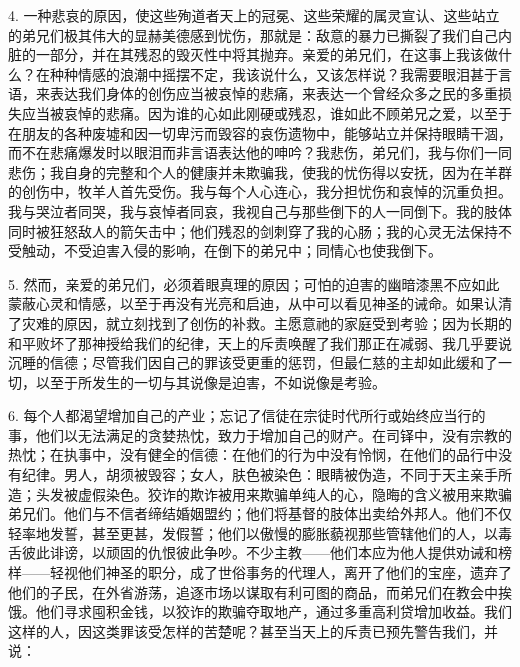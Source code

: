 4. 一种悲哀的原因，使这些殉道者天上的冠冕、这些荣耀的属灵宣认、这些站立的弟兄们极其伟大的显赫美德感到忧伤，那就是：敌意的暴力已撕裂了我们自己内脏的一部分，并在其残忍的毁灭性中将其抛弃。亲爱的弟兄们，在这事上我该做什么？在种种情感的浪潮中摇摆不定，我该说什么，又该怎样说？我需要眼泪甚于言语，来表达我们身体的创伤应当被哀悼的悲痛，来表达一个曾经众多之民的多重损失应当被哀悼的悲痛。因为谁的心如此刚硬或残忍，谁如此不顾弟兄之爱，以至于在朋友的各种废墟和因一切卑污而毁容的哀伤遗物中，能够站立并保持眼睛干涸，而不在悲痛爆发时以眼泪而非言语表达他的呻吟？我悲伤，弟兄们，我与你们一同悲伤；我自身的完整和个人的健康并未欺骗我，使我的忧伤得以安抚，因为在羊群的创伤中，牧羊人首先受伤。我与每个人心连心，我分担忧伤和哀悼的沉重负担。我与哭泣者同哭，我与哀悼者同哀，我视自己与那些倒下的人一同倒下。我的肢体同时被狂怒敌人的箭矢击中；他们残忍的剑刺穿了我的心肠；我的心灵无法保持不受触动，不受迫害入侵的影响，在倒下的弟兄中；同情心也使我倒下。\par

5. 然而，亲爱的弟兄们，必须着眼真理的原因；可怕的迫害的幽暗漆黑不应如此蒙蔽心灵和情感，以至于再没有光亮和启迪，从中可以看见神圣的诫命。如果认清了灾难的原因，就立刻找到了创伤的补救。主愿意祂的家庭受到考验；因为长期的和平败坏了那神授给我们的纪律，天上的斥责唤醒了我们那正在减弱、我几乎要说沉睡的信德；尽管我们因自己的罪该受更重的惩罚，但最仁慈的主却如此缓和了一切，以至于所发生的一切与其说像是迫害，不如说像是考验。\par

6. 每个人都渴望增加自己的产业；忘记了信徒在宗徒时代所行或始终应当行的事，他们以无法满足的贪婪热忱，致力于增加自己的财产。在司铎中，没有宗教的热忱；在执事中，没有健全的信德：在他们的行为中没有怜悯，在他们的品行中没有纪律。男人，胡须被毁容；女人，肤色被染色：眼睛被伪造，不同于天主亲手所造；头发被虚假染色。狡诈的欺诈被用来欺骗单纯人的心，隐晦的含义被用来欺骗弟兄们。他们与不信者缔结婚姻盟约；他们将基督的肢体出卖给外邦人。他们不仅轻率地发誓，甚至更甚，发假誓；他们以傲慢的膨胀藐视那些管辖他们的人，以毒舌彼此诽谤，以顽固的仇恨彼此争吵。不少主教——他们本应为他人提供劝诫和榜样——轻视他们神圣的职分，成了世俗事务的代理人，离开了他们的宝座，遗弃了他们的子民，在外省游荡，追逐市场以谋取有利可图的商品，而弟兄们在教会中挨饿。他们寻求囤积金钱，以狡诈的欺骗夺取地产，通过多重高利贷增加收益。我们这样的人，因这类罪该受怎样的苦楚呢？甚至当天上的斥责已预先警告我们，并说：\par


